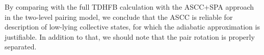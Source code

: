 \documentclass[%
superscriptaddress,
showpacs,
nofootinbib,
amsmath,amssymb,
aps,
prc,
twocolumn,
floatfix ]%
{revtex4-1}
\begin{document}
%
%

By comparing with the full TDHFB calculation with the ASCC+SPA approach
in the two-level pairing model,
we conclude that the ASCC is reliable for description of low-lying
collective states, for which the adiabatic approximation is justifiable.
In addition to that, we should note that the pair rotation is properly separated.
\end{document}

